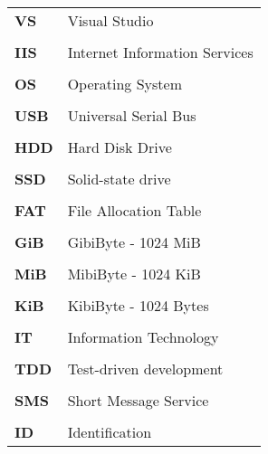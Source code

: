 \begin{longtable}{l p{10cm}}
\textbf{VS} & Visual Studio\\\\
\textbf{IIS} & Internet Information Services\\\\
\textbf{OS} & Operating System\\\\
\textbf{USB} & Universal Serial Bus\\\\
\textbf{HDD} & Hard Disk Drive\\\\
\textbf{SSD} & Solid-state drive\\\\
\textbf{FAT} & File Allocation Table\\\\
\textbf{GiB} & GibiByte - 1024 MiB\\\\
\textbf{MiB} & MibiByte - 1024 KiB\\\\
\textbf{KiB} & KibiByte - 1024 Bytes\\\\
\textbf{IT} & Information Technology\\\\
\textbf{TDD} & Test-driven development \\\\
\textbf{SMS} & Short Message Service \\\\
\textbf{ID} & Identification
\end{longtable}




